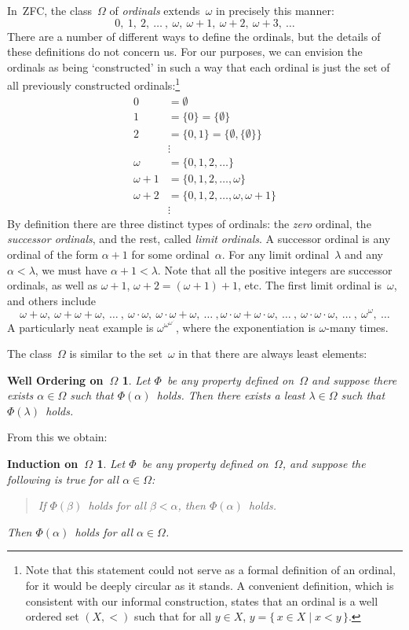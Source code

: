 \documentclass[letterpaper]{article}
\newtheorem*{wo}{Well Ordering on~$\Omega$}
\newtheorem*{induction}{Induction on~$\Omega$}
\begin{document}
In~ZFC, the class~$\Omega$ of \emph{ordinals} extends~$\omega$ in precisely this manner:
$$0,\ 1,\ 2,\ \ldots\ ,\ \omega,\ \omega+1,\ \omega+2,\ \omega+3,\ \ldots$$
There are a number of different ways to define the ordinals, but the details of these definitions do not concern us. For our purposes, we can envision the ordinals as being `constructed' in such a way that each ordinal is just the set of all previously constructed ordinals:\footnote{Note that this statement could not serve as a formal definition of an ordinal, for it would be deeply circular as it stands. A convenient definition, which is consistent with our informal construction, states that an ordinal is a well ordered set $(X,<)$ such that for all $y\in X$, $y=\{\,x\in X\mid x<y\,\}$.}
\begin{align*}
0&=\emptyset\\
1&=\{0\}=\{\emptyset\}\\
2&=\{0,1\}=\{\emptyset,\{\emptyset\}\}\\
 &\vdots\\
\omega&=\{0,1,2,\ldots\}\\
\omega+1&=\{0,1,2,\ldots,\omega\}\\
\omega+2&=\{0,1,2,\ldots,\omega,\omega+1\}\\
 &\vdots
\end{align*}
By definition there are three distinct types of ordinals: the \emph{zero} ordinal, the \emph{successor ordinals}, and the rest, called \emph{limit ordinals}. A successor ordinal is any ordinal of the form $\alpha+1$ for some ordinal~$\alpha$. For any limit ordinal~$\lambda$ and any $\alpha<\lambda$, we must have $\alpha+1<\lambda$. Note that all the positive integers are successor ordinals, as well as $\omega+1$, $\omega+2=(\omega+1)+1$, etc.  The first limit ordinal is~$\omega$, and others include
$$\omega+\omega,\ \omega+\omega+\omega,\ \ldots\ ,\ \omega\cdot\omega,\ \omega\cdot\omega+\omega,\ \ldots\ ,\omega\cdot\omega+\omega\cdot\omega,\ \ldots\ ,\ \omega\cdot\omega\cdot\omega,\ \ldots\ ,\ \omega^{\omega},\ \ldots$$
A particularly neat example is $\omega^{\omega^{\omega^{\iddots}}}$, where the exponentiation is $\omega$-many times.

The class~$\Omega$ is similar to the set~$\omega$ in that there are always least elements:
\begin{wo}
Let $\Phi$~be any property defined on~$\Omega$ and suppose there exists $\alpha\in\Omega$ such that $\Phi(\alpha)$~holds. Then there exists a least $\lambda\in\Omega$ such that $\Phi(\lambda)$~holds.
\end{wo}
\noindent From this we obtain:
\begin{induction}
Let $\Phi$~be any property defined on~$\Omega$, and suppose the following is true for all $\alpha\in\Omega$:
\begin{quote}
If $\Phi(\beta)$~holds for all $\beta<\alpha$, then $\Phi(\alpha)$~holds.
\end{quote}
Then $\Phi(\alpha)$~holds for all $\alpha\in\Omega$.
\end{induction}
\end{document}
